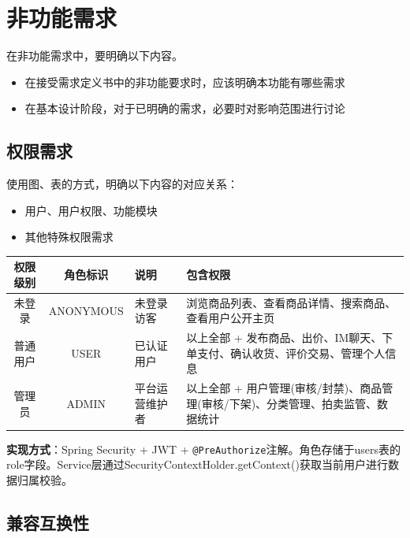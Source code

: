 \documentclass[12pt,a4paper]{ctexart}
\numberwithin{figure}{section}
\numberwithin{table}{section}
\begin{document}
\section{非功能需求}

在非功能需求中，要明确以下内容。

\begin{itemize}
    \item 在接受需求定义书中的非功能要求时，应该明确本功能有哪些需求
    \item 在基本设计阶段，对于已明确的需求，必要时对影响范围进行讨论
\end{itemize}

\subsection{权限需求}

使用图、表的方式，明确以下内容的对应关系：

\begin{itemize}
    \item 用户、用户权限、功能模块
    \item 其他特殊权限需求
\end{itemize}

\begin{center}
\renewcommand{\arraystretch}{1.3}
\begin{tabular}{|c|c|p{3cm}|p{6cm}|}
\hline
\rowcolor{tableheader}
\textbf{权限级别} & \textbf{角色标识} & \textbf{说明} & \textbf{包含权限} \\
\hline
未登录 & ANONYMOUS & 未登录访客 & 浏览商品列表、查看商品详情、搜索商品、查看用户公开主页 \\
\hline
普通用户 & USER & 已认证用户 & 以上全部 + 发布商品、出价、IM聊天、下单支付、确认收货、评价交易、管理个人信息 \\
\hline
管理员 & ADMIN & 平台运营维护者 & 以上全部 + 用户管理(审核/封禁)、商品管理(审核/下架)、分类管理、拍卖监管、数据统计 \\
\hline
\end{tabular}
\end{center}

\textbf{实现方式}：Spring Security + JWT + \verb|@PreAuthorize|注解。角色存储于users表的role字段。Service层通过SecurityContextHolder.getContext()获取当前用户进行数据归属校验。

\subsection{兼容互换性}
\end{document}
